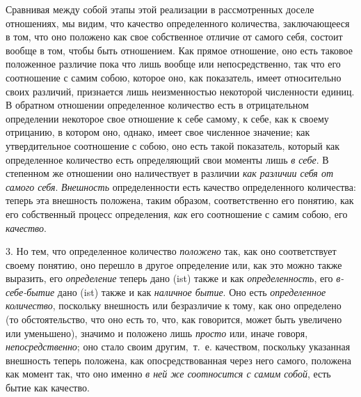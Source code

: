 Сравнивая между собой этапы этой реализации в рассмотренных доселе
отношениях, мы видим, что качество определенного количества, заключающееся
в том, что оно положено как свое собственное отличие от самого себя,
состоит вообще в том, чтобы быть отношением. Как прямое отношение, оно есть
таковое положенное различие пока что лишь вообще или непосредственно, так
что его соотношение с самим собою, которое оно, как показатель, имеет
относительно своих различий, признается лишь неизменностью некоторой
численности единиц. В обратном отношении определенное количество есть в
отрицательном определении некоторое свое отношение к себе самому, к себе,
как к своему отрицанию, в котором оно, однако, имеет свое численное
значение; как утвердительное соотношение с собою, оно есть такой
показатель, который как определенное количество есть определяющий свои
моменты лишь {\em в себе}. В степенном же отношении оно
наличествует в различии {\em как различии себя от
самого себя}. {\em Внешность} определенности есть
качество определенного количества: теперь эта внешность положена, таким
образом, соответственно его понятию, как его собственный процесс
определения, {\em как} его соотношение с самим собою,
его {\em качество}.

3. Но тем, что определенное количество {\em положено}
так, как оно соответствует своему понятию, оно перешло в другое определение
или, как это можно также выразить, его
{\em определение} теперь дано (ist) также и как
{\em определенность}, его
{\em в-себе-бытие} дано (ist) также и как
{\em наличное бытие}. Оно есть
{\em определенное количество}, поскольку внешность или
безразличие к тому, как оно определено (то обстоятельство, что оно есть то,
что, как говорится, может быть увеличено или уменьшено), значимо и положено
лишь {\em просто} или, иначе говоря,
{\em непосредственно}; оно стало своим другим,~т.~е.
качеством, поскольку указанная внешность теперь положена, как
опосредствованная через него самого, положена как момент так, что оно
именно {\em в ней же соотносится с самим собой}, есть
бытие как качество.

